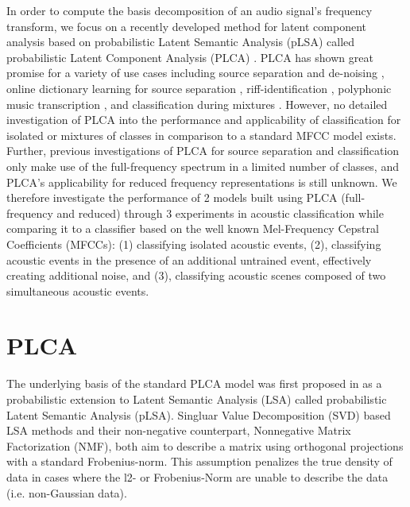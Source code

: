 \documentclass[a4paper,10pt,final]{ThesisStyle}
\begin{document}
In order to compute the basis decomposition of an audio signal's frequency transform, we focus on a recently developed method for latent component analysis based on probabilistic Latent Semantic Analysis (pLSA) \cite{Hofmann1999} called probabilistic Latent Component Analysis (PLCA) \cite{SmaragdisRajShashanka}.   PLCA has shown great promise for a variety of use cases including source separation and de-noising \cite{Smaragdis2007a,Smaragdis2007}, online dictionary learning for source separation \cite{Duan2012}, riff-identification \cite{Weiss2011}, polyphonic music transcription \cite{Benetos2011}, and classification during mixtures \cite{Nam2012}.  However, no detailed investigation of PLCA into the performance and applicability of classification for isolated or mixtures of classes in comparison to a standard MFCC model exists.  Further, previous investigations of PLCA for source separation and classification only make use of the full-frequency spectrum in a limited number of classes, and PLCA's applicability for reduced frequency representations is still unknown.  We therefore investigate the performance of 2 models built using PLCA (full-frequency and reduced) through 3 experiments in acoustic classification while comparing it to a classifier based on the well known Mel-Frequency Cepstral Coefficients (MFCCs): (1) classifying isolated acoustic events, (2), classifying acoustic events in the presence of an additional untrained event, effectively creating additional noise, and (3), classifying acoustic scenes composed of two simultaneous acoustic events.  

\section{PLCA}

The underlying basis of the standard PLCA model was first proposed in \cite{Hofmann1999} as a probabilistic extension to Latent Semantic Analysis (LSA) called probabilistic Latent Semantic Analysis (pLSA).  Singluar Value Decomposition (SVD) based LSA methods and their non-negative counterpart, Nonnegative Matrix Factorization (NMF), both aim to describe a matrix using orthogonal projections with a standard Frobenius-norm.  This assumption penalizes the true density of data in cases where the l2- or Frobenius-Norm are unable to describe the data (i.e. non-Gaussian data).  
\end{document}
